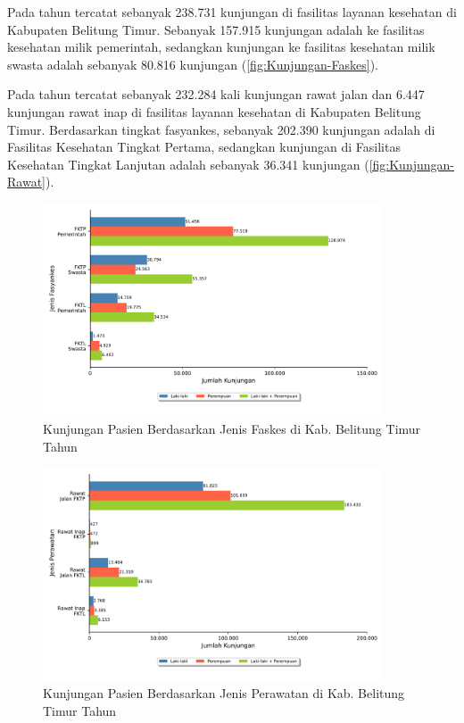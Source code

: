 Pada tahun \tP tercatat sebanyak 238.731 kunjungan di fasilitas layanan kesehatan di Kabupaten Belitung Timur. Sebanyak 157.915 kunjungan adalah ke fasilitas kesehatan milik pemerintah, sedangkan kunjungan ke fasilitas kesehatan milik swasta adalah sebanyak 80.816 kunjungan (\autoref{fig:Kunjungan-Faskes}).

Pada tahun \tP tercatat sebanyak 232.284 kali kunjungan rawat jalan dan 6.447 kunjungan rawat inap di fasilitas layanan kesehatan di Kabupaten Belitung Timur. Berdasarkan tingkat fasyankes, sebanyak 202.390 kunjungan adalah di Fasilitas Kesehatan Tingkat Pertama, sedangkan kunjungan di Fasilitas Kesehatan Tingkat Lanjutan adalah sebanyak 36.341 kunjungan (\autoref{fig:Kunjungan-Rawat}).

\begin{figure}[!htb]
    \centering{}
    \includegraphics[width=0.9\textwidth]{bab_02/bab_02_1_kunjunganFaskes}
    \caption{Kunjungan Pasien Berdasarkan Jenis Faskes di Kab. Belitung Timur Tahun \tP}
    \label{fig:Kunjungan-Faskes}
\end{figure}

\begin{figure}[!htb]
    \centering{}
    \includegraphics[width=0.9\textwidth]{bab_02/bab_02_2_rawat}
    \caption{Kunjungan Pasien Berdasarkan Jenis Perawatan di Kab. Belitung Timur Tahun \tP}
    \label{fig:Kunjungan-Rawat}
\end{figure}

